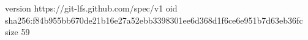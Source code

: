 version https://git-lfs.github.com/spec/v1
oid sha256:f84b955bb670de21b16e27a52ebb3398301ee6d368d1f6ce6e951b7d63eb36fc
size 59
